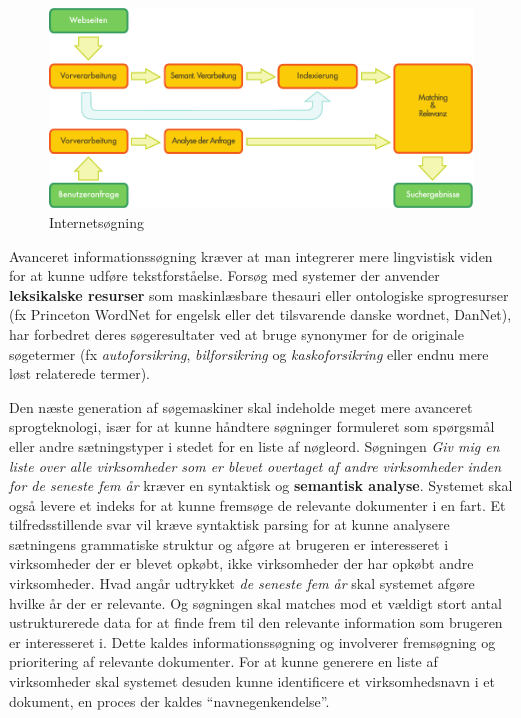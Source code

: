 \documentclass[]{../../metanetpaper}
\begin{document}
\begin{multicols}{2}
\begin{figure}[htb]
  \center
  \includegraphics[width=\textwidth]{../_media/german/web_search_architecture}
  \caption{Internetsøgning}
  \label{fig:websearcharch_de}
\end{figure}

Avanceret informationss\o gning kr\ae ver at man integrerer mere lingvistisk viden for at kunne udf\o re tekstforst\aa else. Fors\o g med systemer der anvender {\bf leksikalske resurser} som maskinl\ae sbare thesauri eller ontologiske sprogresurser (fx Princeton WordNet for engelsk eller det tilsvarende danske wordnet, DanNet), har forbedret deres s\o geresultater ved at bruge synonymer for de originale s\o getermer (fx {\it autoforsikring}, {\it bilforsikring} og {\it kaskoforsikring} eller endnu mere l\o st relaterede termer). 


Den n\ae ste generation af s\o gemaskiner skal indeholde meget mere avanceret sprogteknologi, is\ae r for at kunne h\aa ndtere s\o gninger formuleret som sp\o rgsm\aa l eller andre s\ae tningstyper i stedet for en liste af n\o gleord. S\o gningen {\it Giv mig en liste over alle virksomheder som er blevet overtaget af andre virksomheder inden for de seneste fem \aa r} kr\ae ver en syntaktisk og {\bf semantisk analyse}. Systemet skal \mbox{ogs\aa} levere et indeks for at kunne frems\o ge de relevante dokumenter i en fart. Et tilfredsstillende svar vil kr\ae ve syntaktisk parsing for at kunne analysere s\ae tningens grammatiske struktur og afg\o re at brugeren er interesseret i virksomheder der er blevet opk\o bt, ikke virksomheder der har opk\o bt andre virksomheder. Hvad ang\aa r udtrykket {\it de seneste fem \aa r} skal systemet afg\o re hvilke \aa r der er relevante. Og s\o gningen skal matches mod et v\ae ldigt stort antal ustrukturerede data for at finde frem til den relevante information som brugeren er interesseret i. Dette kaldes informationss\o gning og involverer frems\o gning og prioritering af relevante dokumenter. For at kunne generere en liste af virksomheder skal systemet desuden kunne identificere et virksomhedsnavn i et dokument, en proces der kaldes ``navnegenkendelse''.



\end{multicols}
\end{document}
